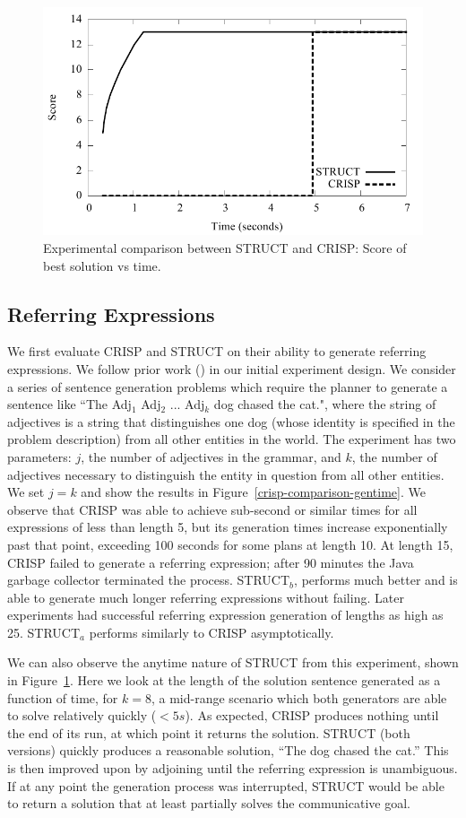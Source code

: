 \begin{figure}
\centering
\includegraphics[width=0.7 \linewidth ]{../analysis/plots/complex-goal/complex-goal-anytime.pdf}
\caption{Experimental comparison between STRUCT and  CRISP:
Score of best solution vs time.}
\label{crisp-comparison-score}
\end{figure}

\subsection{Referring Expressions}
We first evaluate CRISP and STRUCT on their ability to generate
referring expressions. We follow prior work (\cite{koller_experiences_2011})
in our initial experiment design.  We consider a series of sentence
generation problems which require the planner to generate a sentence
like ``The Adj$_1$ Adj$_2$ ... Adj$_k$ dog chased the cat.",
where the string of adjectives is a string that distinguishes one
dog (whose identity is specified in the problem description) from
all other entities in the world.
The experiment has two parameters: $j$, the number of adjectives in
the grammar, and $k$, the number of adjectives necessary to
distinguish the entity in question from all other entities. We set $j
= k$ and show the results in Figure~\ref{crisp-comparison-gentime}.
We observe that CRISP was able to achieve
sub-second or similar times for all expressions of less than length 5, but its
generation times increase exponentially past that point, exceeding 100
seconds for some plans at length 10. At length 15, CRISP failed to
generate a referring expression; after 90 minutes the Java garbage
collector terminated the process. STRUCT$_b$, performs much better and
is able to generate much longer referring expressions without failing.
Later experiments had successful referring expression generation of lengths
as high as 25.  STRUCT$_a$ performs similarly to CRISP asymptotically.

We can also observe the anytime nature of STRUCT from this experiment,
shown in Figure~\ref{crisp-comparison-score}.  Here we look at the
length of the solution sentence generated as a function of time, for
$k=8$, a mid-range scenario which both generators are able to solve
relatively quickly ($< 5s$).  As expected, CRISP produces nothing until
the end of its run, at which point it returns the solution. STRUCT (both versions)
quickly produces a reasonable solution, ``The dog chased the
cat.''  This is then improved upon by adjoining until the referring
expression is unambiguous. If at any point the generation process was
interrupted, STRUCT would be able to return a solution that at least
partially solves the communicative goal.

